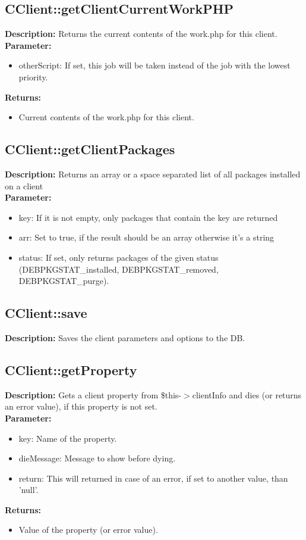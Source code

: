\subsection{CClient::getClientCurrentWorkPHP}
\textbf{Description:} Returns the current contents of the work.php for this client.\\
\textbf{Parameter:}
\begin{itemize}
\item otherScript: If set, this job will be taken instead of the job with the lowest priority.
\end{itemize}
\textbf{Returns:}
\begin{itemize}
\item Current contents of the work.php for this client.
\end{itemize}

\subsection{CClient::getClientPackages}
\textbf{Description:} Returns an array or a space separated list of all packages installed on a client\\
\textbf{Parameter:}
\begin{itemize}
\item key: If it is not empty, only packages that contain the key are returned
\item arr: Set to true, if the result should be an array otherwise it's a string
\item status: If set, only returns packages of the given status (DEBPKGSTAT\_installed, DEBPKGSTAT\_removed, DEBPKGSTAT\_purge).
\end{itemize}

\subsection{CClient::save}
\textbf{Description:} Saves the client parameters and options to the DB.\\

\subsection{CClient::getProperty}
\textbf{Description:} Gets a client property from \$this-$>$clientInfo and dies (or returns an error value), if this property is not set.\\
\textbf{Parameter:}
\begin{itemize}
\item key: Name of the property.
\item dieMessage: Message to show before dying.
\item return: This will returned in case of an error, if set to another value, than 'null'.
\end{itemize}
\textbf{Returns:}
\begin{itemize}
\item Value of the property (or error value).
\end{itemize}

